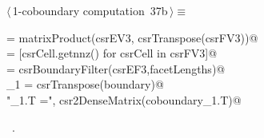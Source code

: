 \documentclass[11pt,oneside]{article}	%
\begin{document}
\begin{flushleft} \small \label{scrap69}
\protect{}$\langle\,$1-coboundary computation\nobreak\ {\footnotesize 37b}$\,\rangle\equiv$
\vspace{-1ex}
\begin{list}{}{} \item
\mbox{} = matrixProduct(csrEV3, csrTranspose(csrFV3))@\\
\mbox{}\verb@facetLengths = [csrCell.getnnz() for csrCell in csrFV3]@\\
\mbox{}\verb@boundary = csrBoundaryFilter(csrEF3,facetLengths)@\\
\mbox{}\verb@coboundary_1 = csrTranspose(boundary)@\\
\mbox{}\verb@print "\ncoboundary_1.T =\n", csr2DenseMatrix(coboundary_1.T)@\\
\mbox{}\verb@@{\NWsep}
\end{list}
\vspace{-1ex}
\footnotesize\addtolength{\baselineskip}{-1ex}
\begin{list}{}{\setlength{\itemsep}{-\parsep}\setlength{\itemindent}{-\leftmargin}}
\item \NWtxtMacroRefIn\ .
\end{list}
\end{flushleft}
\end{document}
